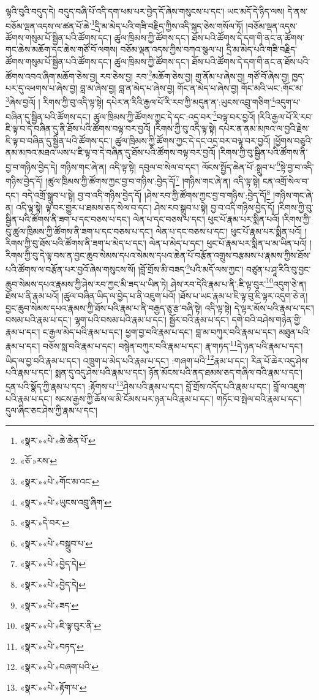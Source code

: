 ལྷའི་བུའི་བདུད་དེ། བདུད་བཞི་པོ་འདི་དག་ཕམ་པར་བྱེད་དོ་ཞེས་གསུངས་པ་དང་། ཡང་མདོ་དེ་ཉིད་ལས། དེ་ནས་བཅོམ་ལྡན་འདས་ལ་ཚན་པོ་ཆེ་\footnote{«སྣར་»«པེ་»ཆེ་ཆེན་པོ་}དྲི་མ་མེད་པའི་གཟི་བརྗིད་ཀྱིས་འདི་སྐད་ཅེས་གསོལ་ཏོ། །བཅོམ་ལྡན་འདས་ཚོགས་གསུམ་པོ་སྦྱིན་པའི་ཚོགས་དང་། ཚུལ་ཁྲིམས་ཀྱི་ཚོགས་དང་། ཐོས་པའི་ཚོགས་དེ་དག་གི་ནང་ན་ཚོགས་གང་ཆེས་མཆོག་དང་ཆེས་གཙོ་བོ་ལགས། བཅོམ་ལྡན་འདས་ཀྱིས་བཀའ་སྩལ་པ། དྲི་མ་མེད་པའི་གཟི་བརྗིད་ཚོགས་གསུམ་པོ་སྦྱིན་པའི་ཚོགས་དང་། ཚུལ་ཁྲིམས་ཀྱི་ཚོགས་དང་། ཐོས་པའི་ཚོགས་དེ་དག་གི་ནང་ན་ཐོས་པའི་ཚོགས་འབའ་ཞིག་མཆོག་ཅེས་བྱ། རབ་ཅེས་བྱ། རབ་\footnote{«ཅོ་»རས་}མཆོག་ཅེས་བྱ། གྱ་ནོམ་པ་ཞེས་བྱ། གཙོ་བོ་ཞེས་བྱ། ཁྱད་པར་དུ་འཕགས་པ་ཞེས་བྱ། བླ་མ་ཞེས་བྱ། བླ་ན་མེད་པ་ཞེས་བྱ། གོང་ན་མེད་པ་ཞེས་བྱ། གོང་མའི་ཡང་:གོང་མ་\footnote{«སྣར་»«པེ་»གོང་མ་འང་}ཞེས་བྱའོ། །
རིགས་ཀྱི་བུ་འདི་ལྟ་སྟེ། དཔེར་ན་རིའི་རྒྱལ་པོ་རི་རབ་ཀྱི་མདུན་ན་:ཡུངས་འབྲུ་གཅིག་\footnote{«སྣར་»«པེ་»ཡུངས་འབྲུ་ཞིག་}འདུག་པ་བཞིན་དུ་སྦྱིན་པའི་ཚོགས་དང་། ཚུལ་ཁྲིམས་ཀྱི་ཚོགས་ཀྱང་དེ་དང་:འདྲ་བར་\footnote{«སྣར་»དེ་བར་}བལྟ་བར་བྱའོ། །རིའི་རྒྱལ་པོ་རི་རབ་ཇི་ལྟ་བ་དེ་བཞིན་དུ་ནི་ཐོས་པའི་ཚོགས་བལྟ་བར་བྱའོ། །རིགས་ཀྱི་བུ་འདི་ལྟ་སྟེ། དཔེར་ན་ནམ་མཁའ་ལ་བྱའི་རྗེས་ཇི་ལྟ་བ་བཞིན་དུ་སྦྱིན་པའི་ཚོགས་དང་། ཚུལ་ཁྲིམས་ཀྱི་ཚོགས་ཀྱང་དེ་དང་འདྲ་བར་བལྟ་བར་བྱའོ། །ཕྱོགས་བཅུའི་ནམ་མཁའ་མཐའ་ཡས་པ་ཇི་ལྟ་བ་དེ་བཞིན་དུ་ཐོས་པའི་ཚོགས་བལྟ་བར་བྱའོ། །རིགས་ཀྱི་བུ་སྦྱིན་པའི་ཚོགས་ནི་བྱ་བ་གཉིས་བྱེད་དེ། གཉིས་གང་ཞེ་ན། འདི་ལྟ་སྟེ། དབུལ་བ་སེལ་བ་དང་། ལོངས་སྤྱོད་ཆེན་པོ་:སྒྲུབ་པ་\footnote{«སྣར་»«པེ་»བསྒྲུབ་པ་}སྟེ་བྱ་བ་འདི་གཉིས་བྱེད་དོ། །ཚུལ་ཁྲིམས་ཀྱི་ཚོགས་ཀྱང་བྱ་བ་གཉིས་:བྱེད་དོ།\footnote{«སྣར་»«པེ་»བྱེད་དེ།} །གཉིས་གང་ཞེ་ན། འདི་ལྟ་སྟེ། ངན་འགྲོ་སེལ་བ་དང་། བདེ་འགྲོ་སྒྲུབ་པ་སྟེ། བྱ་བ་འདི་གཉིས་བྱེད་དོ། །ཤེས་རབ་ཀྱི་ཚོགས་ཀྱང་བྱ་བ་གཉིས་:བྱེད་དོ།\footnote{«སྣར་»«པེ་»བྱེད་དེ།} །གཉིས་གང་ཞེ་ན། འདི་ལྟ་སྟེ། ལྟ་བར་གྱུར་པ་ཐམས་ཅད་སེལ་བ་དང་། ཤེས་རབ་སྒྲུབ་པ་སྟེ། བྱ་བ་འདི་གཉིས་བྱེད་དོ། །རིགས་ཀྱི་བུ་སྦྱིན་པའི་ཚོགས་ནི་ཟག་པ་དང་བཅས་པ་དང་། ལེན་པ་དང་བཅས་པ་དང་། ཕུང་པོ་རྣམ་པར་སྨིན་པའོ། །རིགས་ཀྱི་བུ་ཚུལ་ཁྲིམས་ཀྱི་ཚོགས་ནི་ཟག་པ་དང་བཅས་པ་དང་། ལེན་པ་དང་བཅས་པ་དང་། ཕུང་པོ་རྣམ་པར་སྨིན་པའོ། །རིགས་ཀྱི་བུ་ཐོས་པའི་ཚོགས་ནི་ཟག་པ་མེད་པ་དང་། ལེན་པ་མེད་པ་དང་། ཕུང་པོ་རྣམ་པར་སྨིན་པ་མ་ཡིན་པའོ། །རིགས་ཀྱི་བུ་དེ་ལྟ་བས་ན་བྱང་ཆུབ་སེམས་དཔའ་སེམས་དཔའ་ཆེན་པོ་བརྩོན་འགྲུས་བརྩམས་པ་རྣམས་ཀྱིས་ཐོས་པའི་ཚོགས་ལ་བརྩོན་པར་བྱའོ་ཞེས་གསུངས་སོ། །བློ་གྲོས་མི་བཟད་\footnote{«སྣར་»«པེ་»ཟད་}པའི་མདོ་ལས་ཀྱང་། བཙུན་པ་ཤཱ་རིའི་བུ་བྱང་ཆུབ་སེམས་དཔའ་རྣམས་ཀྱི་ཤེས་རབ་ཀྱང་མི་ཟད་པ་ཡིན་ཏེ། ཤེས་རབ་དེའི་རྣམ་པ་ནི་:ཇི་ལྟ་བུར་\footnote{«སྣར་»«པེ་»ཇི་ལྟ་བུར་ནི་}འདུག་ཅེ་ན། ཐོས་པ་ནི་རྣམ་པའོ། །ཚུལ་བཞིན་ཡིད་ལ་བྱེད་པ་ནི་འཇུག་པའོ། །ཐོས་པ་ཡང་རྣམ་པ་ཇི་ལྟ་བུ་ཇི་ལྟར་འདུག་ཅེ་ན། བྱང་ཆུབ་སེམས་དཔའ་རྣམས་ཀྱི་ཐོས་པའི་རྣམ་པ་ནི་བརྒྱད་ཅུ་རྩ་བཞི་སྟེ། འདི་ལྟ་སྟེ། དེ་ལྟར་མོས་པའི་རྣམ་པ་དང་། བསམ་པའི་རྣམ་པ་དང་། ལྷག་པའི་བསམ་པའི་རྣམ་པ་དང་། སྦྱོར་བའི་རྣམ་པ་དང་། དགེ་བའི་བཤེས་གཉེན་གྱི་རྣམ་པ་དང་། ང་རྒྱལ་མེད་པའི་རྣམ་པ་དང་། ཕྱག་བྱ་བའི་རྣམ་པ་དང་། བླ་མ་བཀུར་བའི་རྣམ་པ་དང་། མཐུན་པའི་རྣམ་པ་དང་། བཅོས་སླ་བའི་རྣམ་པ་དང་། བསྙེན་བཀུར་བའི་རྣམ་པ་དང་། རྣ་གཏད་\footnote{«སྣར་»«པེ་»བཏད་}དེ་ཉན་པའི་རྣམ་པ་དང་། ཡིད་ལ་བྱ་བའི་རྣམ་པ་དང་། འཁྲུག་པ་མེད་པའི་རྣམ་པ་དང་། :གཞག་པའི་\footnote{«སྣར་»«པེ་»བཞག་པའི་}རྣམ་པ་དང་། རིན་པོ་ཆེར་འདུ་ཤེས་པའི་རྣམ་པ་དང་། སྨན་དུ་འདུ་ཤེས་པའི་རྣམ་པ་དང་། ཉོན་མོངས་པའི་ནད་ཐམས་ཅད་གཞིལ་བའི་རྣམ་པ་དང་། དྲན་པའི་སྣོད་ཀྱི་རྣམ་པ་དང་། :རྟོགས་པ་\footnote{«སྣར་»«པེ་»རྟོག་པ་}ཤེས་པའི་རྣམ་པ་དང་། བློ་གྲོས་འདོད་པའི་རྣམ་པ་དང་། བློ་ལ་འཇུག་པའི་རྣམ་པ་དང་། སངས་རྒྱས་ཀྱི་ཆོས་ལ་མི་ངོམས་པར་ཉན་པའི་རྣམ་པ་དང་། གཏོང་བ་སྤེལ་བའི་རྣམ་པ་དང་། དུལ་ཞིང་ཅང་ཤེས་ཀྱི་རྣམ་པ་དང་། 